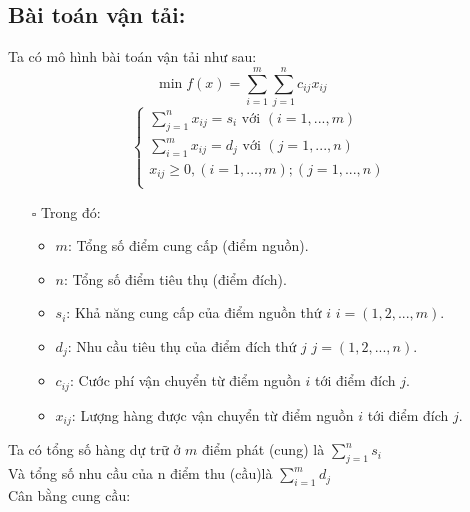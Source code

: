 \documentclass{article}
\begin{document}
\subsection{Bài toán vận tải:}
\hspace{0.4cm} Ta có mô hình bài toán vận tải như sau:
\begin{equation*}
        \min{f(x)} = \sum_{i=1}^m \sum_{j=1}^n c_{ij}x_{ij} \text{ }\text{ }\text{ }\text{ }
\end{equation*}
\begin{equation*}
    \begin{cases}
        \displaystyle \sum_{j=1}^n x_{ij} = s_i \text{ với } (i=1,...,m) \\
        \displaystyle \sum_{i=1}^m x_{ij} = d_j \text{ với } (j=1,...,n) \\
        \displaystyle x_{ij} \geq 0,(i=1,...,m); (j=1,...,n) \\
    \end{cases}
\end{equation*}
\begin{itemize}
    \item [$\square$] Trong đó:
    \begin{itemize}[label=\textbullet]
        \item $m$: Tổng số điểm cung cấp (điểm nguồn).
        \item $n$: Tổng số điểm tiêu thụ (điểm đích).
        \item $s_i$: Khả năng cung cấp của điểm nguồn thứ $i$ $i=(1,2,...,m)$.
        \item $d_j$: Nhu cầu tiêu thụ của điểm đích thứ $j$ $j=(1,2,...,n)$.
        \item $c_{ij}$: Cước phí vận chuyển từ điểm nguồn $i$ tới điểm đích $j$.
        \item $x_{ij}$: Lượng hàng được vận chuyển từ điểm nguồn $i$ tới điểm đích $j$.
    \end{itemize}
\end{itemize}
\hspace{0.4cm} Ta có tổng số hàng dự trữ ở $m$ điểm phát (cung) là $\sum_{j=1}^n s_i$\medskip \\
\indent Và tổng số nhu cầu của n điểm thu (cầu)là $\sum_{i=1}^m d_j$\medskip \\
\indent Cân bằng cung cầu:
\end{document}
